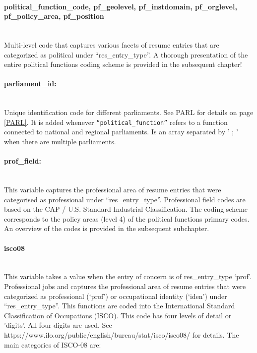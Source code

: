 \documentclass{article}
\begin{document}
\paragraph{political\_function\_code, pf\_geolevel, pf\_instdomain, pf\_orglevel, pf\_policy\_area, pf\_position}\\
    
    Multi-level code that captures various facets of resume entries that are categorized as political under ``res\_entry\_type''. A thorough presentation of the entire political functions coding scheme is provided in the subsequent chapter!

\paragraph{parliament\_id:}\\
    Unique identification code for different parliaments. See PARL for details on page \ref{PARL}.  It is added whenever \texttt{``political\_function''} refers to a function connected to national and regional parliaments. Is an array separated by ' ; '  when there are multiple parliaments.

\paragraph{prof\_field:}\\
    This variable captures the professional area of resume entries that were categorised as professional under ``res\_entry\_type''.  
    Professional field codes are based on the CAP / U.S. Standard Industrial Classification. The coding scheme corresponds to the policy areas (level 4) of the political functions primary codes. An overview of the codes is provided in the subsequent subchapter.

\paragraph{isco08}\\
    This variable takes a value when the entry of concern is of res\_entry\_type `prof'. Professional jobs and 
    captures the professional area of resume entries that were categorized as professional (`prof') or occupational identity (`iden') under ``res\_entry\_type''. This functions are coded into the International Standard Classification of Occupations (ISCO). This code has four levels of detail or 'digits'. All four digits are used. See https://www.ilo.org/public/english/bureau/stat/isco/isco08/ for details. The main categories of ISCO-08 are:
    
\end{document}
